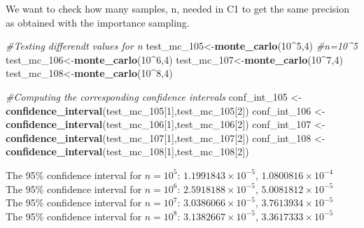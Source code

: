 \documentclass[
]{article}
\newenvironment{Shaded}{\begin{snugshade}}{\end{snugshade}}
\newcommand{\CommentTok}[1]{\textcolor[rgb]{0.56,0.35,0.01}{\textit{#1}}}
\newcommand{\DecValTok}[1]{\textcolor[rgb]{0.00,0.00,0.81}{#1}}
\newcommand{\KeywordTok}[1]{\textcolor[rgb]{0.13,0.29,0.53}{\textbf{#1}}}
\newcommand{\NormalTok}[1]{#1}
\newcommand{\OperatorTok}[1]{\textcolor[rgb]{0.81,0.36,0.00}{\textbf{#1}}}
\newcommand{\StringTok}[1]{\textcolor[rgb]{0.31,0.60,0.02}{#1}}
\begin{document}
We want to check how many samples, n, needed in C1 to get the same
precision as obtained with the importance sampling.

\begin{Shaded}
\begin{Highlighting}[]
\CommentTok{#Testing differendt values for n}
\NormalTok{test_mc_}\DecValTok{105}\NormalTok{<-}\KeywordTok{monte_carlo}\NormalTok{(}\DecValTok{10}\OperatorTok{^}\DecValTok{5}\NormalTok{,}\DecValTok{4}\NormalTok{) }\CommentTok{#n=10^5}
\NormalTok{test_mc_}\DecValTok{106}\NormalTok{<-}\KeywordTok{monte_carlo}\NormalTok{(}\DecValTok{10}\OperatorTok{^}\DecValTok{6}\NormalTok{,}\DecValTok{4}\NormalTok{)}
\NormalTok{test_mc_}\DecValTok{107}\NormalTok{<-}\KeywordTok{monte_carlo}\NormalTok{(}\DecValTok{10}\OperatorTok{^}\DecValTok{7}\NormalTok{,}\DecValTok{4}\NormalTok{)}
\NormalTok{test_mc_}\DecValTok{108}\NormalTok{<-}\KeywordTok{monte_carlo}\NormalTok{(}\DecValTok{10}\OperatorTok{^}\DecValTok{8}\NormalTok{,}\DecValTok{4}\NormalTok{)}

\CommentTok{#Computing the corresponding confidence intervals}
\NormalTok{conf_int_}\DecValTok{105}\NormalTok{ <-}\StringTok{ }\KeywordTok{confidence_interval}\NormalTok{(test_mc_}\DecValTok{105}\NormalTok{[}\DecValTok{1}\NormalTok{],test_mc_}\DecValTok{105}\NormalTok{[}\DecValTok{2}\NormalTok{])}
\NormalTok{conf_int_}\DecValTok{106}\NormalTok{ <-}\StringTok{ }\KeywordTok{confidence_interval}\NormalTok{(test_mc_}\DecValTok{106}\NormalTok{[}\DecValTok{1}\NormalTok{],test_mc_}\DecValTok{106}\NormalTok{[}\DecValTok{2}\NormalTok{])}
\NormalTok{conf_int_}\DecValTok{107}\NormalTok{ <-}\StringTok{ }\KeywordTok{confidence_interval}\NormalTok{(test_mc_}\DecValTok{107}\NormalTok{[}\DecValTok{1}\NormalTok{],test_mc_}\DecValTok{107}\NormalTok{[}\DecValTok{2}\NormalTok{])}
\NormalTok{conf_int_}\DecValTok{108}\NormalTok{ <-}\StringTok{ }\KeywordTok{confidence_interval}\NormalTok{(test_mc_}\DecValTok{108}\NormalTok{[}\DecValTok{1}\NormalTok{],test_mc_}\DecValTok{108}\NormalTok{[}\DecValTok{2}\NormalTok{])}
\end{Highlighting}
\end{Shaded}

The 95\% confidence interval for \(n=10^5\):
\ensuremath{1.1991843\times 10^{-5}},
\ensuremath{1.0800816\times 10^{-4}}\\
The 95\% confidence interval for \(n=10^6\):
\ensuremath{2.5918188\times 10^{-5}},
\ensuremath{5.0081812\times 10^{-5}}\\
The 95\% confidence interval for \(n=10^7\):
\ensuremath{3.0386066\times 10^{-5}},
\ensuremath{3.7613934\times 10^{-5}}\\
The 95\% confidence interval for \(n=10^8\):
\ensuremath{3.1382667\times 10^{-5}},
\ensuremath{3.3617333\times 10^{-5}}
\end{document}
